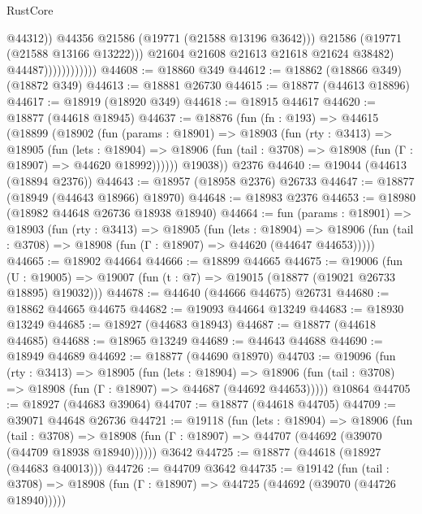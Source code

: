 \begin{lexlean}{RustCore}
\begin{coremodule}
                                      @44312))
                                  @44356
                                  @21586
                                  (@19771 (@21588 @13196 @3642)))
                                @21586
                                (@19771 (@21588 @13166 @13222)))
                              @21604
                              @21608
                              @21613
                              @21618
                              @21624
                              @38482)
                            @44487))))))))))))
@44608 := @18860 @349
@44612 := @18862 (@18866 @349) (@18872 @349)
@44613 := @18881 @26730
@44615 := @18877 (@44613 @18896)
@44617 := @18919 (@18920 @349)
@44618 := @18915 @44617
@44620 := @18877 (@44618 @18945)
@44637 := @18876
    (fun (fn : @193) =>
    @44615
      (@18899
        (@18902
          (fun (params : @18901) =>
          @18903
            (fun (rty : @3413) =>
            @18905
              (fun (lets : @18904) =>
              @18906 (fun (tail : @3708) => @18908 (fun (Γ : @18907) => @44620 @18992))))))
        @19038))
    @2376
@44640 := @19044 (@44613 (@18894 @2376))
@44643 := @18957 (@18958 @2376) @26733
@44647 := @18877 (@18949 (@44643 @18966) @18970)
@44648 := @18983 @2376
@44653 := @18980 (@18982 @44648 @26736 @18938 @18940)
@44664 := fun (params : @18901) =>
  @18903
    (fun (rty : @3413) =>
    @18905
      (fun (lets : @18904) =>
      @18906 (fun (tail : @3708) => @18908 (fun (Γ : @18907) => @44620 (@44647 @44653)))))
@44665 := @18902 @44664
@44666 := @18899 @44665
@44675 := @19006
    (fun (U : @19005) => @19007 (fun (t : @7) => @19015 (@18877 (@19021 @26733 @18895) @19032)))
@44678 := @44640 (@44666 @44675) @26731
@44680 := @18862 @44665 @44675
@44682 := @19093 @44664 @13249
@44683 := @18930 @13249
@44685 := @18927 (@44683 @18943)
@44687 := @18877 (@44618 @44685)
@44688 := @18965 @13249
@44689 := @44643 @44688
@44690 := @18949 @44689
@44692 := @18877 (@44690 @18970)
@44703 := @19096
    (fun (rty : @3413) =>
    @18905
      (fun (lets : @18904) =>
      @18906 (fun (tail : @3708) => @18908 (fun (Γ : @18907) => @44687 (@44692 @44653)))))
    @10864
@44705 := @18927 (@44683 @39064)
@44707 := @18877 (@44618 @44705)
@44709 := @39071 @44648 @26736
@44721 := @19118
    (fun (lets : @18904) =>
    @18906
      (fun (tail : @3708) =>
      @18908 (fun (Γ : @18907) => @44707 (@44692 (@39070 (@44709 @18938 @18940))))))
    @3642
@44725 := @18877 (@44618 (@18927 (@44683 @40013)))
@44726 := @44709 @3642
@44735 := @19142
    (fun (tail : @3708) => @18908 (fun (Γ : @18907) => @44725 (@44692 (@39070 (@44726 @18940)))))

\end{coremodule}
\end{lexlean}
